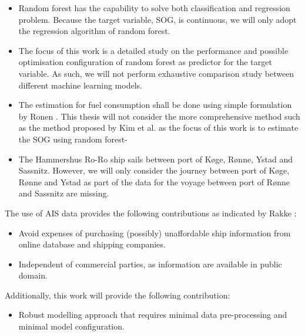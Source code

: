 \begin{itemize}
    \item Random forest has the capability to solve both classification and regression problem. Because the target variable, SOG, is continuous, we will only adopt the regression algorithm of random forest.
    \item The focus of this work is a detailed study on the performance and possible optimisation configuration of random forest as predictor for the target variable. As such, we will not perform exhaustive comparison study between different machine learning models.
    \item The estimation for fuel consumption shall be done using simple formulation by Ronen \cite{Ronen.1982,Ronen.2011}. This thesis will not consider the more comprehensive method such as the method proposed by Kim et al. \cite{Kim.2020} as the focus of this work is to estimate the SOG using random forest-
    \item The Hammershus Ro-Ro ship sails between port of K{\o}ge, R{\o}nne, Ystad and Sassnitz. However, we will only consider the journey between port of K{\o}ge, R{\o}nne and Ystad as part of the data for the voyage between port of R{\o}nne and Sassnitz are missing. 
\end{itemize}

\newpage

The use of AIS data provides the following contributions as indicated by Rakke \cite{Rakke2016}: 

\begin{itemize}
    \item Avoid expenses of purchasing (possibly) unaffordable ship information from online database and shipping companies. 
    \item Independent of commercial parties, as information are available in public domain.
\end{itemize}

Additionally, this work will provide the following contribution:

\begin{itemize}
    \item Robust modelling approach that requires minimal data pre-processing and minimal model configuration.
\end{itemize} 






 






